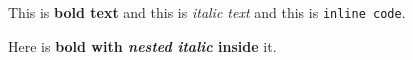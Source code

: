 This is \textbf{bold text} and this is \textit{italic text} and this is \texttt{inline code}.

Here is \textbf{bold with \textit{nested italic} inside} it.
